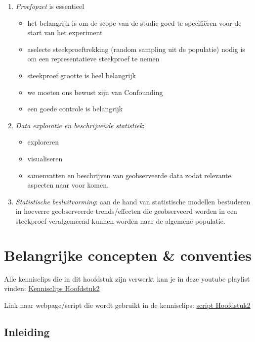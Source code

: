 \documentclass[
  12pt,dutch]{book}
\providecommand{\tightlist}{%
  \setlength{\itemsep}{0pt}\setlength{\parskip}{0pt}}
\theoremstyle{definition}
\theoremstyle{definition}
\theoremstyle{definition}
\theoremstyle{definition}
\theoremstyle{remark}
\begin{document}
\begin{enumerate}
\def\labelenumi{\arabic{enumi}.}
\item
  \emph{Proefopzet} is essentieel

  \begin{itemize}
  \item
    het belangrijk is om de scope van de studie goed te specifiëren voor de start van het experiment
  \item
    aselecte steekproeftrekking (random sampling uit de populatie) nodig is om een representatieve steekproef te nemen
  \item
    steekproef grootte is heel belangrijk
  \item
    we moeten ons bewust zijn van Confounding
  \item
    een goede controle is belangrijk
  \end{itemize}
\item
  \emph{Data exploratie en beschrijvende statistiek}:

  \begin{itemize}
  \tightlist
  \item
    exploreren
  \item
    visualiseren
  \item
    samenvatten en beschrijven van geobserveerde data zodat relevante aspecten naar voor komen.
  \end{itemize}
\item
  \emph{Statistische besluitvorming}: aan de hand van statistische modellen bestuderen in hoeverre geobserveerde trends/effecten die geobserveerd worden in een steekproef veralgemeend kunnen worden naar de algemene populatie.
\end{enumerate}

\chapter{Belangrijke concepten \& conventies}\label{belangrijke-concepten-conventies}

Alle kennisclips die in dit hoofdstuk zijn verwerkt kan je in deze youtube playlist vinden: \href{https://www.youtube.com/playlist?list=PLZH1hP8_LbJJ7apU5sAbRlUsve2nWz5ev}{Kennisclips Hoofdstuk2}

Link naar webpage/script die wordt gebruikt in de kennisclips: \href{https://statomics.github.io/sbc/rmd/02-concepts.html}{script Hoofdstuk2}

\section{Inleiding}\label{inleiding-1}
\end{document}
